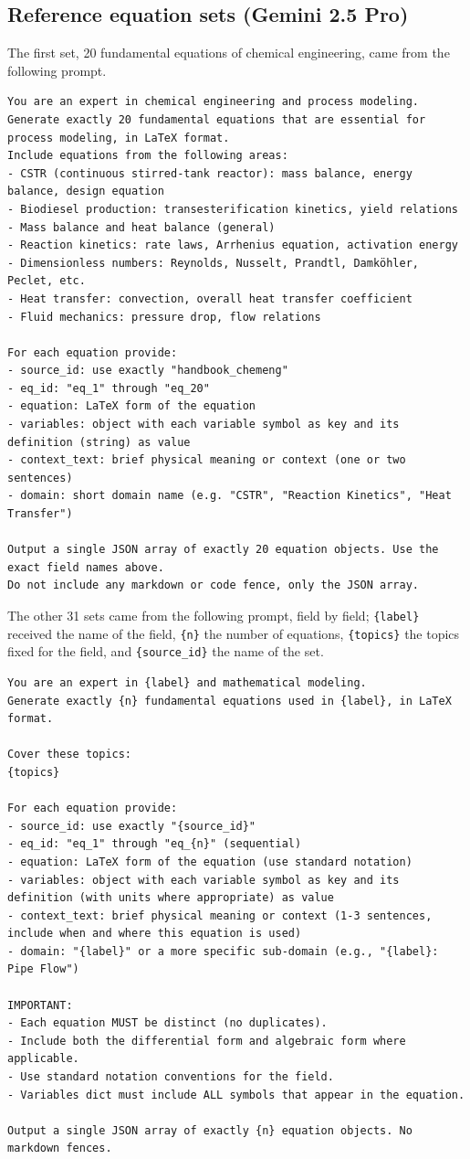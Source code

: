 \subsection*{Reference equation sets (Gemini 2.5 Pro)}
The first set, 20 fundamental equations of chemical engineering, came from the following prompt.
\begin{Verbatim}[fontsize=\scriptsize, breaklines=true, frame=single]
You are an expert in chemical engineering and process modeling.
Generate exactly 20 fundamental equations that are essential for process modeling, in LaTeX format.
Include equations from the following areas:
- CSTR (continuous stirred-tank reactor): mass balance, energy balance, design equation
- Biodiesel production: transesterification kinetics, yield relations
- Mass balance and heat balance (general)
- Reaction kinetics: rate laws, Arrhenius equation, activation energy
- Dimensionless numbers: Reynolds, Nusselt, Prandtl, Damköhler, Peclet, etc.
- Heat transfer: convection, overall heat transfer coefficient
- Fluid mechanics: pressure drop, flow relations

For each equation provide:
- source_id: use exactly "handbook_chemeng"
- eq_id: "eq_1" through "eq_20"
- equation: LaTeX form of the equation
- variables: object with each variable symbol as key and its definition (string) as value
- context_text: brief physical meaning or context (one or two sentences)
- domain: short domain name (e.g. "CSTR", "Reaction Kinetics", "Heat Transfer")

Output a single JSON array of exactly 20 equation objects. Use the exact field names above.
Do not include any markdown or code fence, only the JSON array.
\end{Verbatim}
The other 31 sets came from the following prompt, field by field; \texttt{\{label\}} received the
name of the field, \texttt{\{n\}} the number of equations, \texttt{\{topics\}} the topics fixed for
the field, and \texttt{\{source\_id\}} the name of the set.
\begin{Verbatim}[fontsize=\scriptsize, breaklines=true, frame=single]
You are an expert in {label} and mathematical modeling.
Generate exactly {n} fundamental equations used in {label}, in LaTeX format.

Cover these topics:
{topics}

For each equation provide:
- source_id: use exactly "{source_id}"
- eq_id: "eq_1" through "eq_{n}" (sequential)
- equation: LaTeX form of the equation (use standard notation)
- variables: object with each variable symbol as key and its definition (with units where appropriate) as value
- context_text: brief physical meaning or context (1-3 sentences, include when and where this equation is used)
- domain: "{label}" or a more specific sub-domain (e.g., "{label}: Pipe Flow")

IMPORTANT:
- Each equation MUST be distinct (no duplicates).
- Include both the differential form and algebraic form where applicable.
- Use standard notation conventions for the field.
- Variables dict must include ALL symbols that appear in the equation.

Output a single JSON array of exactly {n} equation objects. No markdown fences.
\end{Verbatim}

